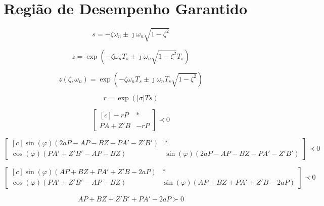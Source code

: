 \chapter{Região de Desempenho Garantido}

\begin{equation}
  s = -\zeta\omega_n \pm \jmath\omega_n \sqrt {1-\zeta^2} \label{eq:PontoPlanoS}
\end{equation}

\begin{equation}
  z = \exp{\left(-\zeta\omega_nT_s \pm \jmath\omega_n\sqrt{1-\zeta^2}T_s\right)}\label{eq:PontoPlanoZ}
\end{equation}

\begin{equation}
  z(\zeta,\omega_n) = \exp{\left(-\zeta\omega_nT_s \pm \jmath\omega_nT_s\sqrt{1-\zeta^2}\right)}\label{eq:FuncaoPontoZ}
\end{equation}

\begin{equation}
  r = \exp{\left(|\sigma|Ts\right)}\label{eq:RaioEstabilidadeRelativa}
\end{equation}

\begin{equation}
  \begin{bmatrix*}[c]
    -rP       & * \\
    PA + Z'B  & -rP
  \end{bmatrix*}
  \prec 0\label{eq:LMIEstabilidadeRelativa}
\end{equation}

\begin{equation}
  \begin{bmatrix*}[c]
    \sin{(\varphi)(2aP - AP - BZ - PA' - Z'B')} & * \\
    \cos{(\varphi)(PA' + Z'B' - AP - BZ)}       & \sin{(\varphi)(2aP - AP - BZ - PA' - Z'B')}
  \end{bmatrix*}
  \prec 0\label{eq:LMIESetorConicoDireito}
\end{equation}

\begin{equation}
  \begin{bmatrix*}[c]
    \sin{(\varphi)(AP + BZ + PA' + Z'B -2aP)} & * \\
    \cos{(\varphi)(PA' + Z'B'- AP - BZ)}      &  \sin{(\varphi)(AP + BZ + PA' + Z'B -2aP)}
  \end{bmatrix*}
  \prec 0\label{eq:LMIESetorConicoEsquerdo}
\end{equation}

\begin{equation}
  AP + BZ + Z'B' + PA' -2aP\label{eq:LMIRightBounded} \succ 0
\end{equation}